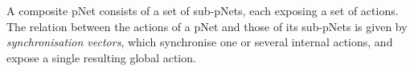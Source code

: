 \documentclass[smallcondensed]{svjour3}
\newcommand{\noteSB}[2][color=green!40, size=\tiny]{\todo[#1]{{\bf Simon: } {#2}}}
\newcommand{\noteEM}[2][color=blue!40, size=\tiny]{\todo[#1]{{\bf Eric: } {#2}}}
\def\AlgA{\mathcal{A}}
\begin{document}
A composite pNet consists of a set of sub-pNets, each exposing
a set of actions. %
The relation between the actions of a pNet and those of its sub-pNets
is given by  \emph{synchronisation vectors}, which %
synchronise one or several internal actions, and
expose a single resulting global action.





\end{document}
